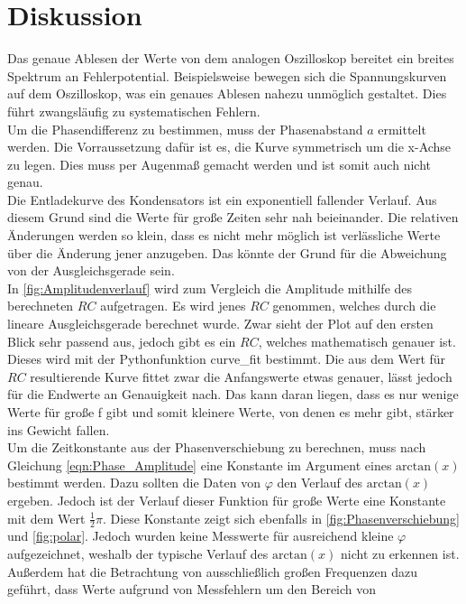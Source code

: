 %

%
\section{Diskussion}

Das genaue Ablesen der Werte von dem analogen Oszilloskop bereitet ein breites Spektrum an Fehlerpotential. Beispielsweise
bewegen sich die Spannungskurven auf dem Oszilloskop, was ein genaues Ablesen nahezu unmöglich gestaltet. Dies führt
zwangsläufig zu systematischen Fehlern. 
\\
Um die Phasendifferenz zu bestimmen, muss der Phasenabstand $a$ ermittelt werden. Die Vorraussetzung dafür ist es, die 
Kurve symmetrisch um die x-Achse zu legen. Dies muss per Augenmaß gemacht werden und ist somit auch nicht genau.
\\
Die Entladekurve des Kondensators ist ein exponentiell fallender Verlauf. Aus diesem Grund sind die Werte für große Zeiten 
sehr nah beieinander. Die relativen Änderungen werden so klein, dass es nicht mehr möglich ist verlässliche Werte über die 
Änderung jener anzugeben. Das könnte der Grund für die Abweichung von der Ausgleichsgerade sein.
\\
In \autoref{fig:Amplitudenverlauf} wird zum Vergleich die Amplitude mithilfe des berechneten $RC$ aufgetragen. 
Es wird jenes $RC$ genommen, welches durch die lineare Ausgleichsgerade berechnet wurde. Zwar sieht der Plot auf den ersten Blick 
sehr passend aus, jedoch gibt es ein $RC$, welches mathematisch genauer ist. Dieses wird mit der Pythonfunktion curve\_fit 
bestimmt. Die aus dem Wert für $RC$ resultierende Kurve fittet zwar die Anfangswerte etwas genauer, lässt jedoch für die Endwerte an 
Genauigkeit nach. Das kann daran liegen, dass es nur wenige Werte für große f gibt und somit kleinere Werte, von denen es 
mehr gibt, stärker ins Gewicht fallen. 
\\
Um die Zeitkonstante aus der Phasenverschiebung zu berechnen, muss nach Gleichung \eqref{eqn:Phase_Amplitude} eine Konstante 
im Argument eines $\text{arctan}(x)$ bestimmt werden. Dazu sollten die Daten von $\varphi$ den Verlauf des 
$\text{arctan}(x)$ ergeben. Jedoch ist der Verlauf dieser Funktion für große Werte eine Konstante mit dem Wert $\frac{1}{2} \pi$.
Diese Konstante zeigt sich ebenfalls in \ref{fig:Phasenverschiebung} und \ref{fig:polar}. 
Jedoch wurden keine Messwerte für ausreichend kleine $\varphi$ aufgezeichnet, weshalb der typische Verlauf des $\text{arctan}(x)$
nicht zu erkennen ist. Außerdem hat die Betrachtung von ausschließlich  großen Frequenzen dazu geführt, dass Werte aufgrund von Messfehlern um den Bereich von 
